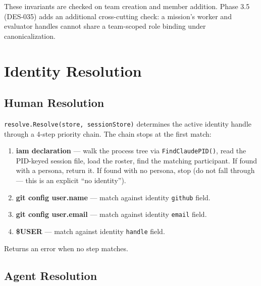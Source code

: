 \documentclass[a4paper,10pt]{article}
\newcommand{\field}[1]{\texttt{#1}}
\begin{document}
These invariants are checked on team creation and member addition.
Phase 3.5 (DES-035) adds an additional cross-cutting check: a
mission's worker and evaluator handles cannot share a team-scoped
role binding under canonicalization.

\section{Identity Resolution}

\subsection{Human Resolution}

\texttt{resolve.Resolve(store, sessionStore)} determines the active
identity handle through a 4-step priority chain.  The chain stops
at the first match:

\begin{enumerate}
  \item \textbf{iam declaration} --- walk the process tree via
    \texttt{FindClaudePID()}, read the PID-keyed session file, load
    the roster, find the matching participant.  If found with a
    persona, return it.  If found with no persona, stop (do not fall
    through --- this is an explicit ``no identity'').
  \item \textbf{git config user.name} --- match against identity
    \field{github} field.
  \item \textbf{git config user.email} --- match against identity
    \field{email} field.
  \item \textbf{\$USER} --- match against identity \field{handle}
    field.
\end{enumerate}

Returns an error when no step matches.

\subsection{Agent Resolution}
\end{document}
